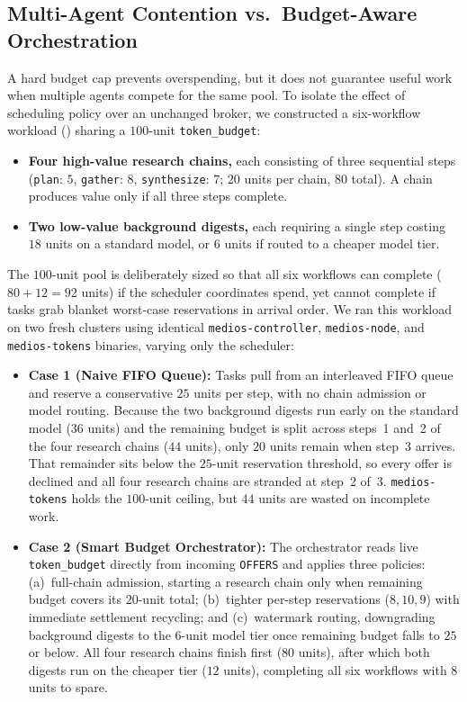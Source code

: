 \documentclass[11pt]{article}
\begin{document}
\subsection{Multi-Agent Contention vs.\ Budget-Aware Orchestration}
A hard budget cap prevents overspending, but it does not guarantee useful work when multiple agents compete for the same pool. To isolate the effect of scheduling policy over an unchanged broker, we constructed a six-workflow workload () sharing a $100$-unit \texttt{token\_budget}:

\begin{itemize}
  \item \textbf{Four high-value research chains,} each consisting of three sequential steps (\texttt{plan}: $5$, \texttt{gather}: $8$, \texttt{synthesize}: $7$; $20$ units per chain, $80$ total). A chain produces value only if all three steps complete.
  \item \textbf{Two low-value background digests,} each requiring a single step costing $18$ units on a standard model, or $6$ units if routed to a cheaper model tier.
\end{itemize}

The $100$-unit pool is deliberately sized so that all six workflows can complete ($80 + 12 = 92$ units) if the scheduler coordinates spend, yet cannot complete if tasks grab blanket worst-case reservations in arrival order. We ran this workload on two fresh clusters using identical \texttt{medios-controller}, \texttt{medios-node}, and \texttt{medios-tokens} binaries, varying only the scheduler:

\begin{itemize}
  \item \textbf{Case 1 (Naive FIFO Queue):} Tasks pull from an interleaved FIFO queue and reserve a conservative $25$ units per step, with no chain admission or model routing. Because the two background digests run early on the standard model ($36$ units) and the remaining budget is split across steps~1 and~2 of the four research chains ($44$ units), only $20$ units remain when step~3 arrives. That remainder sits below the $25$-unit reservation threshold, so every offer is declined and all four research chains are stranded at step~2 of~3. \texttt{medios-tokens} holds the $100$-unit ceiling, but $44$ units are wasted on incomplete work.
  \item \textbf{Case 2 (Smart Budget Orchestrator):} The orchestrator reads live \texttt{token\_budget} directly from incoming \texttt{OFFERS} and applies three policies: (a)~full-chain admission, starting a research chain only when remaining budget covers its $20$-unit total; (b)~tighter per-step reservations ($8, 10, 9$) with immediate settlement recycling; and (c)~watermark routing, downgrading background digests to the $6$-unit model tier once remaining budget falls to $25$ or below. All four research chains finish first ($80$ units), after which both digests run on the cheaper tier ($12$ units), completing all six workflows with $8$ units to spare.
\end{itemize}
\end{document}
